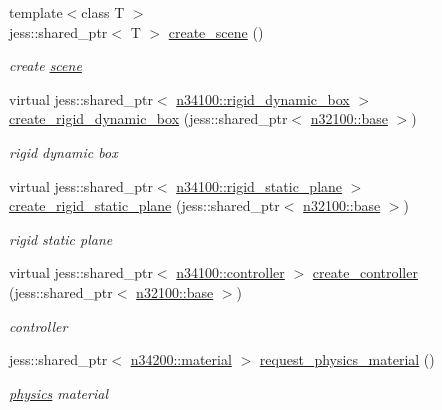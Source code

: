 \begin{DoxyCompactItemize}
{\footnotesize template$<$class T $>$ }\\jess::shared\_\-ptr$<$ T $>$ \hyperlink{classnebula_1_1content_1_1universe_1_1admin_1_1base_a0ef9b92f44d27ed52db2bbfefc1fa805}{create\_\-scene} ()
\begin{DoxyCompactList}\small\item\em create \hyperlink{namespacenebula_1_1content_1_1scene}{scene} \item\end{DoxyCompactList}\item 
virtual jess::shared\_\-ptr$<$ \hyperlink{classnebula_1_1content_1_1actor_1_1admin_1_1rigid__dynamic__box}{n34100::rigid\_\-dynamic\_\-box} $>$ \hyperlink{classnebula_1_1content_1_1universe_1_1admin_1_1base_ac5eb6106c17dd1fd16ecf209ada51edf}{create\_\-rigid\_\-dynamic\_\-box} (jess::shared\_\-ptr$<$ \hyperlink{classnebula_1_1content_1_1scene_1_1admin_1_1base}{n32100::base} $>$)
\begin{DoxyCompactList}\small\item\em rigid dynamic box \item\end{DoxyCompactList}\item 
virtual jess::shared\_\-ptr$<$ \hyperlink{classnebula_1_1content_1_1actor_1_1admin_1_1rigid__static__plane}{n34100::rigid\_\-static\_\-plane} $>$ \hyperlink{classnebula_1_1content_1_1universe_1_1admin_1_1base_a8a67671d71633f028172fd1a0191d584}{create\_\-rigid\_\-static\_\-plane} (jess::shared\_\-ptr$<$ \hyperlink{classnebula_1_1content_1_1scene_1_1admin_1_1base}{n32100::base} $>$)
\begin{DoxyCompactList}\small\item\em rigid static plane \item\end{DoxyCompactList}\item 
virtual jess::shared\_\-ptr$<$ \hyperlink{classnebula_1_1content_1_1actor_1_1admin_1_1controller}{n34100::controller} $>$ \hyperlink{classnebula_1_1content_1_1universe_1_1admin_1_1base_aca835d45e63a0f069a10695ca3c7d2b1}{create\_\-controller} (jess::shared\_\-ptr$<$ \hyperlink{classnebula_1_1content_1_1scene_1_1admin_1_1base}{n32100::base} $>$)
\begin{DoxyCompactList}\small\item\em controller \item\end{DoxyCompactList}\item 
jess::shared\_\-ptr$<$ \hyperlink{classnebula_1_1content_1_1actor_1_1physics_1_1material}{n34200::material} $>$ \hyperlink{classnebula_1_1content_1_1universe_1_1admin_1_1base_a65152a782100c9b33ed4a60ddc5373d4}{request\_\-physics\_\-material} ()
\begin{DoxyCompactList}\small\item\em \hyperlink{namespacenebula_1_1content_1_1physics}{physics} material \item\end{DoxyCompactList}\end{DoxyCompactItemize}
